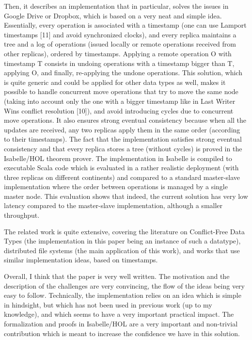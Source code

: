 \documentclass[10pt]{article}
\begin{document}
\begin{spverbatim}
Then, it describes an implementation that in particular, solves the issues in Google Drive or Dropbox, which is based on a very neat and simple idea. Essentially, every operation is associated with a timestamp (one can use Lamport timestamps [11] and avoid synchronized clocks), and every replica maintains a tree and a log of operations (issued locally or remote operations received from other replicas), ordered by timestamps. Applying a remote operation O with timestamp T consists in undoing operations with a timestamp bigger than T, applying O, and finally, re-applying the undone operations. This solution, which is quite generic and could be applied for other data types as well, makes it possible to handle concurrent move operations that try to move the same node (taking into account only the one with a bigger timestamp like in Last Writer Wins conflict resolution [10]), and avoid introducing cycles due to concurrent move operations. It also ensures strong eventual consistency because when all the updates are received, any two replicas apply them in the same order (according to their timestamps). The fact that the implementation satisfies strong eventual consistency and that every replica stores a tree (without cycles) is proved in the Isabelle/HOL theorem prover. The implementation in Isabelle is compiled to executable Scala code which is evaluated in a rather realistic deployment (with three replicas on different continents) and compared to a standard master-slave implementation where the order between operations is managed by a single master node. This evaluation shows that indeed, the current solution has very low latency compared to the master-slave implementation, although a smaller throughput.

The related work is quite extensive, covering the literature on Conflict-Free Data Types (the implementation in this paper being an instance of such a datatype), distributed file systems (the main application of this work), and works that use similar implementation ideas, based on timestamps.

Overall, I think that the paper is very well written. The motivation and the description of the challenges are very convincing, the flow of the ideas being very easy to follow. Technically, the implementation relies on an idea which is simple in hindsight, but which has not been used in previous work (up to my knowledge), and which seems to have a very important practical impact. The formalization and proofs in Isabelle/HOL are a very important and non-trivial contribution which is meant to increase the confidence we have in this solution.


\end{spverbatim}
\end{document}
